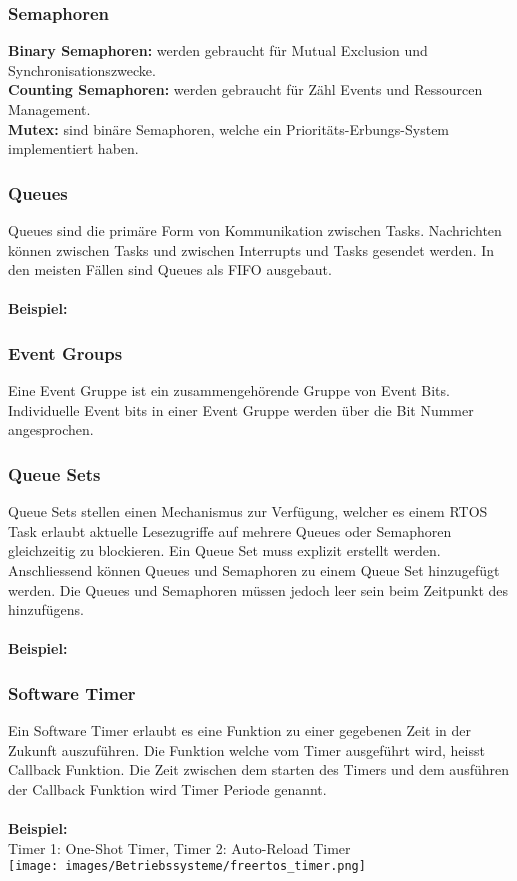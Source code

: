 \subsubsection{Semaphoren}
\textbf{Binary Semaphoren:} werden gebraucht für Mutual Exclusion und Synchronisationszwecke. \\
\textbf{Counting Semaphoren:} werden gebraucht für Zähl Events und Ressourcen Management. \\
\textbf{Mutex:} sind binäre Semaphoren, welche ein Prioritäts-Erbungs-System implementiert haben.

\subsubsection{Queues}
Queues sind die primäre Form von Kommunikation zwischen Tasks. Nachrichten können zwischen Tasks und zwischen Interrupts und Tasks gesendet werden. In den meisten Fällen sind Queues als FIFO ausgebaut. \\ \\
\textbf{Beispiel:}


\subsubsection{Event Groups}
Eine Event Gruppe ist ein zusammengehörende Gruppe von Event Bits. Individuelle Event bits in einer Event Gruppe werden über die Bit Nummer angesprochen.

\clearpage
\subsubsection{Queue Sets}
Queue Sets stellen einen Mechanismus zur Verfügung, welcher es einem RTOS Task erlaubt aktuelle Lesezugriffe auf mehrere Queues oder Semaphoren gleichzeitig zu blockieren. Ein Queue Set muss explizit erstellt werden. Anschliessend können Queues und Semaphoren zu einem Queue Set hinzugefügt werden. Die Queues und Semaphoren müssen jedoch leer sein beim Zeitpunkt des hinzufügens. \\ \\
\textbf{Beispiel:}


\clearpage
\subsubsection{Software Timer}
Ein Software Timer erlaubt es eine Funktion zu einer gegebenen Zeit in der Zukunft auszuführen. Die Funktion welche vom Timer ausgeführt wird, heisst Callback Funktion. Die Zeit zwischen dem starten des Timers und dem ausführen der Callback Funktion wird Timer Periode genannt. \\ \\
\textbf{Beispiel:}\\
Timer 1: One-Shot Timer, Timer 2: Auto-Reload Timer \\
\texttt{[image: images/Betriebssysteme/freertos\_timer.png]}